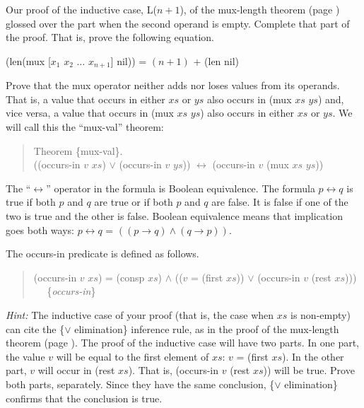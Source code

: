 \begin{ExerciseList}
\Exercise
Our proof of the inductive case, L($n+1$), of the mux-length theorem
(page \pageref{mux-length-thm-induc-case})
glossed over the part when the second operand is empty.
Complete that part of the proof. That is, prove the following equation.

\hspace{1cm} (len(mux [$x_1$ $x_2$ $\dots$ $x_{n+1}$] nil)) = $(n+1)$ + (len nil)

\Exercise [label={ex:mul-val-thm}]
Prove that the mux operator neither adds nor loses values from its operands.
That is, a value that occurs in either $xs$ or $ys$ also occurs in (mux $xs$ $ys$)
and, vice versa, a value that occurs in (mux $xs$ $ys$) also occurs in either $xs$ or $ys$.
We will call this the ``mux-val'' theorem:

\begin{quote}
\label{thm:mux-val}
Theorem \{mux-val\}.\\
((occurs-in $v$ $xs$) $\vee$ (occurs-in $v$ $ys$)) $\leftrightarrow$ (occurs-in $v$ (mux $xs$ $ys$))
\end{quote}

\label{def:equivalence-op}
The ``$\leftrightarrow$''
operator
in the formula is Boolean equivalence.
The formula $p \leftrightarrow q$ is true if both $p$ and $q$ are true
or if both $p$ and $q$ are false. It is false if one of the two is true
and the other is false. Boolean equivalence means that implication goes both ways:
$p \leftrightarrow q$ = $((p \rightarrow q) \wedge (q \rightarrow p))$.

The occurs-in predicate is defined as follows.
\begin{quote}
\label{def:occurs-in}
(occurs-in $v$ $xs$) = (consp $xs$) $\wedge$ (($v$ = (first $xs$)) $\vee$ (occurs-in $v$ (rest $xs$))) ~~ \{\emph{occurs-in}\}
\end{quote}

\emph{Hint:} The inductive case of your proof
(that is, the case when $xs$ is non-empty)
can cite the \{$\vee$ elimination\} inference rule,
as in the proof of the mux-length theorem (page \pageref{mux-length-thm}).
The proof of the inductive case will have two parts.
In one part, the value $v$ will be equal to
the first element of $xs$:
$v$ = (first $xs$).
In the other part, $v$ will occur in (rest $xs$).
That is, (occurs-in $v$ (rest $xs$)) will be true.
Prove both parts, separately.
Since they have the same conclusion,
\{$\vee$ elimination\} confirms that the conclusion is true.


\end{ExerciseList}
